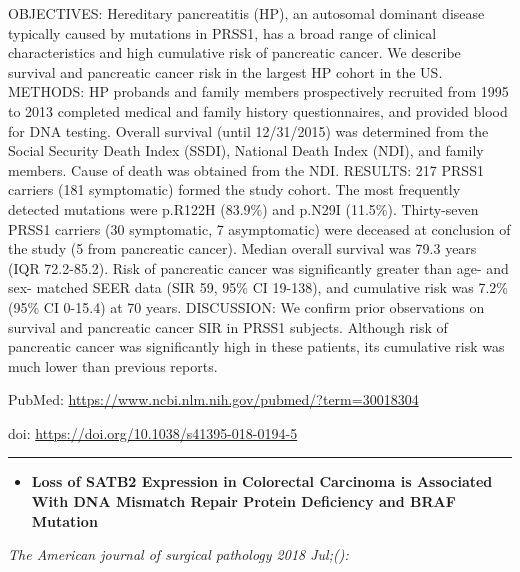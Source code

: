\documentclass[]{article}
\providecommand{\tightlist}{%
  \setlength{\itemsep}{0pt}\setlength{\parskip}{0pt}}
\begin{document}
OBJECTIVES: Hereditary pancreatitis (HP), an autosomal dominant disease
typically caused by mutations in PRSS1, has a broad range of clinical
characteristics and high cumulative risk of pancreatic cancer. We
describe survival and pancreatic cancer risk in the largest HP cohort in
the US. METHODS: HP probands and family members prospectively recruited
from 1995 to 2013 completed medical and family history questionnaires,
and provided blood for DNA testing. Overall survival (until 12/31/2015)
was determined from the Social Security Death Index (SSDI), National
Death Index (NDI), and family members. Cause of death was obtained from
the NDI. RESULTS: 217 PRSS1 carriers (181 symptomatic) formed the study
cohort. The most frequently detected mutations were p.R122H (83.9\%) and
p.N29I (11.5\%). Thirty-seven PRSS1 carriers (30 symptomatic, 7
asymptomatic) were deceased at conclusion of the study (5 from
pancreatic cancer). Median overall survival was 79.3 years (IQR
72.2-85.2). Risk of pancreatic cancer was significantly greater than
age- and sex- matched SEER data (SIR 59, 95\% CI 19-138), and cumulative
risk was 7.2\% (95\% CI 0-15.4) at 70 years. DISCUSSION: We confirm
prior observations on survival and pancreatic cancer SIR in PRSS1
subjects. Although risk of pancreatic cancer was significantly high in
these patients, its cumulative risk was much lower than previous
reports.

PubMed: \url{https://www.ncbi.nlm.nih.gov/pubmed/?term=30018304}

doi: \url{https://doi.org/10.1038/s41395-018-0194-5}

{}

{}

\begin{center}\rule{0.5\linewidth}{\linethickness}\end{center}

\begin{itemize}
\tightlist
\item
  \textbf{Loss of SATB2 Expression in Colorectal Carcinoma is Associated
  With DNA Mismatch Repair Protein Deficiency and BRAF Mutation}
\end{itemize}

\emph{The American journal of surgical pathology 2018 Jul;():}
\end{document}
